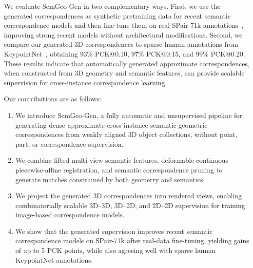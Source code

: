 We evaluate SemGeo-Gen in two complementary ways. First, we use the generated correspondences as synthetic pretraining data for recent semantic correspondence models and then fine-tune them on real SPair-71k annotations~\cite{min2019spair71k}, improving strong recent models without architectural modifications. Second, we compare our generated 3D correspondences to sparse human annotations from KeypointNet~\cite{you2020}, obtaining 93\% PCK@0.10, 97\% PCK@0.15, and 99\% PCK@0.20. These results indicate that automatically generated approximate correspondences, when constructed from 3D geometry and semantic features, can provide scalable supervision for cross-instance correspondence learning.

Our contributions are as follows:
\begin{enumerate}
    \item We introduce SemGeo-Gen, a fully automatic and unsupervised pipeline for generating dense approximate cross-instance semantic-geometric correspondences from weakly aligned 3D object collections, without point, part, or correspondence supervision.

    \item We combine lifted multi-view semantic features, deformable continuous piecewise-affine registration, and semantic correspondence pruning to generate matches constrained by both geometry and semantics.

    \item We project the generated 3D correspondences into rendered views, enabling combinatorially scalable 3D--3D, 3D--2D, and 2D--2D supervision for training image-based correspondence models.

    \item We show that the generated supervision improves recent semantic correspondence models on SPair-71k after real-data fine-tuning, yielding gains of up to 5 PCK points, while also agreeing well with sparse human KeypointNet annotations.
\end{enumerate}





